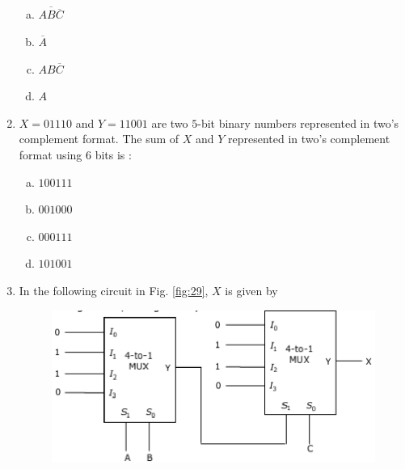 \documentclass[journal,12pt,twocolumn]{IEEEtran}
\begin{document}
\begin{enumerate}
\begin{figure}
\caption{}

\label{fig:28}

\end{figure} 



\begin{enumerate}[(a)]
 
\item $
\overline{AB\overline{C}}
$

\item $
\overline{A}
$

\item $
AB\overline{C}
$

\item $
A
$


\end{enumerate}

\item $X=01110$ and $Y=11001$ are two $5$-bit binary numbers represented in two's complement format. The sum of $X$ and $Y$ represented in two's complement format using $6$ bits is :


\begin{enumerate}[(a)]
 
\item $
100111
$

\item $
001000
$

\item $
000111
$

\item $
101001
$


\end{enumerate}
 
\item In the following circuit in Fig. \ref{fig:29}, $X$ is given by

\begin{figure}

\centering

\includegraphics[width=\columnwidth]{./figs/34.eps}


\end{figure}
\end{enumerate}
\end{document}
